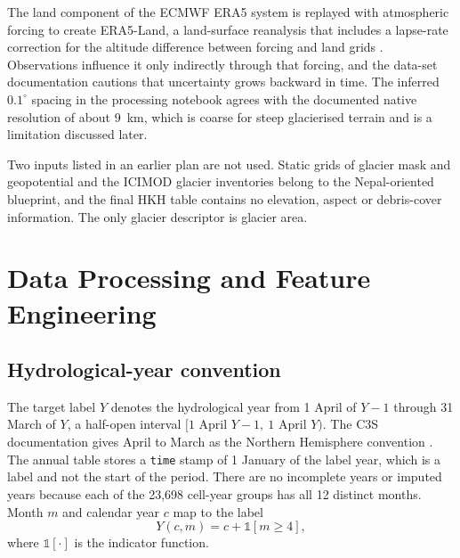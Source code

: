 \documentclass[conference]{IEEEtran}
\begin{document}
The land component of the ECMWF ERA5 system is replayed with atmospheric forcing to create ERA5-Land, a land-surface reanalysis that includes a lapse-rate correction for the altitude difference between forcing and land grids \cite{era5land,era5landpaper}. Observations influence it only indirectly through that forcing, and the data-set documentation cautions that uncertainty grows backward in time. The inferred $0.1^\circ$ spacing in the processing notebook agrees with the documented native resolution of about 9~km, which is coarse for steep glacierised terrain and is a limitation discussed later.

Two inputs listed in an earlier plan are not used. Static grids of glacier mask and geopotential and the ICIMOD glacier inventories belong to the Nepal-oriented blueprint, and the final HKH table contains no elevation, aspect or debris-cover information. The only glacier descriptor is glacier area.

\section{Data Processing and Feature Engineering}\label{sec:processing}
\subsection{Hydrological-year convention}
The target label $Y$ denotes the hydrological year from 1 April of $Y-1$ through 31 March of $Y$, a half-open interval $[\text{1 April } Y{-}1,\ \text{1 April } Y)$. The C3S documentation gives April to March as the Northern Hemisphere convention \cite{wgmsgrid}. The annual table stores a \texttt{time} stamp of 1 January of the label year, which is a label and not the start of the period. There are no incomplete years or imputed years because each of the 23,698 cell-year groups has all 12 distinct months. Month $m$ and calendar year $c$ map to the label
\begin{equation}
Y(c,m)=c+\mathbb{1}[m\ge 4],
\label{eq:hy}
\end{equation}
where $\mathbb{1}[\cdot]$ is the indicator function.
\end{document}
